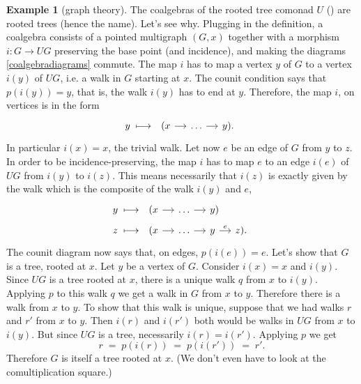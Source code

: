 \documentclass[12pt,oneside,headings=small]{scrbook}
\numberwithin{equation}{section}
\theoremstyle{plain}
\theoremstyle{definition}
\newtheorem{eg}[thm]{Example}
\newcommand{\ar}[2][]{\arrow{#2}{#1}}
\DeclareMathOperator{\1}{\mathbbm{1}}
\DeclareMathOperator{\2}{\mathbbm{2}}
\begin{document}
\begin{eg}[graph theory]\label{rootedtrees}
 The coalgebras of the rooted tree comonad $U$ () are rooted trees (hence the name). 
 Let's see why. Plugging in the definition, a coalgebra consists of a pointed multigraph $(G,x)$ together with a morphism $i:G\to UG$ preserving the base point (and incidence), and making the diagrams \eqref{coalgebradiagrams} commute. The map $i$ has to map a vertex $y$ of $G$ to a vertex $i(y)$ of $UG$, i.e. a walk in $G$ starting at $x$. The counit condition says that $p(i(y))=y$, that is, the walk $i(y)$ has to end at $y$. Therefore, the map $i$, on vertices is in the form 
 $$
 y \;\longmapsto\; 
 \begin{tikzcd}[sep=small]
  (x \ar{r} &\dots \ar{r} & y ) .
 \end{tikzcd}
 $$
 In particular $i(x)=x$, the trivial walk.
 Let now $e$ be an edge of $G$ from $y$ to $z$. In order to be incidence-preserving, the map $i$ has to map $e$ to an edge $i(e)$ of $UG$ from $i(y)$ to $i(z)$. This means necessarily that $i(z)$ is exactly given by the walk which is the composite of the walk $i(y)$ and $e$,
 \begin{align*}
 y \;&\longmapsto\; 
 \begin{tikzcd}[ampersand replacement=\&, sep=small]
  (x \ar{r} \&\dots \ar{r} \& y )   
 \end{tikzcd} \\
   z \;&\longmapsto\; 
 \begin{tikzcd}[ampersand replacement=\&, sep=small]
  (x \ar{r} \&\dots \ar{r} \& y \ar{r}{e} \& z ) .   
 \end{tikzcd}
 \end{align*}
 The counit diagram now says that, on edges, $p(i(e))=e$.
 Let's show that $G$ is a tree, rooted at $x$. Let $y$ be a vertex of $G$. Consider $i(x)=x$ and $i(y)$. Since $UG$ is a tree rooted at $x$, there is a unique walk $q$ from $x$ to $i(y)$. Applying $p$ to this walk $q$ we get a walk in $G$ from $x$ to $y$. Therefore there is a walk from $x$ to $y$. To show that this walk is unique, suppose that we had walks $r$ and $r'$ from $x$ to $y$. 
 Then $i(r)$ and $i(r')$ both would be walks in $UG$ from $x$ to $i(y)$. But since $UG$ is a tree, necessarily $i(r)=i(r')$. Applying $p$ we get 
 $$
 r \;=\; p(i(r)) \;=\; p(i(r')) \;=\; r' .
 $$
 Therefore $G$ is itself a tree rooted at $x$. 
 (We don't even have to look at the comultiplication square.)
 

\end{eg}
\end{document}
